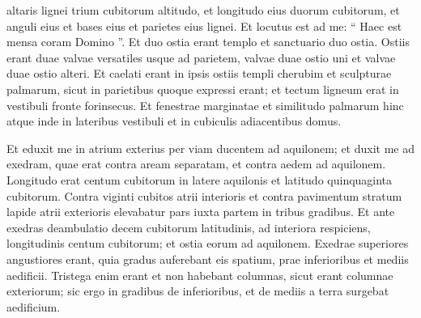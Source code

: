 \begin{biblechapter}
\begin{biblechapter}
\begin{biblechapter}
\begin{biblechapter}
\begin{biblechapter}
\begin{biblechapter}
\begin{biblechapter}
\begin{biblechapter}
\begin{biblechapter}
\begin{biblechapter}
\begin{biblechapter}
\begin{biblechapter}
\begin{biblechapter}
\begin{biblechapter}
\begin{biblechapter}
\begin{biblechapter}
\begin{biblechapter}
\begin{biblechapter}
\begin{biblechapter}
\begin{biblechapter}
\begin{biblechapter}
\begin{biblechapter}
\begin{biblechapter}
\begin{biblechapter}
\begin{biblechapter}
\begin{biblechapter}
\begin{biblechapter}
\begin{biblechapter}
\begin{biblechapter}
\begin{biblechapter}
\begin{biblechapter}
\begin{biblechapter}
\begin{biblechapter}
\begin{biblechapter}
\begin{biblechapter}
\begin{biblechapter}
\begin{biblechapter}
\begin{biblechapter}
\begin{biblechapter}
\begin{biblechapter}
\begin{biblechapter}
\verse altaris lignei trium cubitorum altitudo, et longitudo eius duorum cubitorum, et anguli eius et bases eius et parietes eius lignei. Et locutus est ad me: “ Haec est mensa coram Domino ”.
 \verse Et duo ostia erant templo et sanctuario 
\verse duo ostia. Ostiis erant duae valvae versatiles usque ad parietem, valvae duae ostio uni et valvae duae ostio alteri. 
\verse Et caelati erant in ipsis ostiis templi cherubim et sculpturae palmarum, sicut in parietibus quoque expressi erant; et tectum ligneum erat in vestibuli fronte forinsecus. 
\verse Et fenestrae marginatae et similitudo palmarum hinc atque inde in lateribus vestibuli et in cubiculis adiacentibus domus.
 
\begin{biblechapter}
\verse Et eduxit me in atrium exterius per viam ducentem ad aquilonem; et duxit me ad exedram, quae erat contra aream separatam, et contra aedem ad aquilonem. 
 \verse Longitudo erat centum cubitorum in latere aquilonis et latitudo quinquaginta cubitorum. 
\verse Contra viginti cubitos atrii interioris et contra pavimentum stratum lapide atrii exterioris elevabatur pars iuxta partem in tribus gradibus. 
 \verse Et ante exedras deambulatio decem cubitorum latitudinis, ad interiora respiciens, longitudinis centum cubitorum; et ostia eorum ad aquilonem. 
\verse Exedrae superiores angustiores erant, quia gradus auferebant eis spatium, prae inferioribus et mediis aedificii. 
\verse Tristega enim erant et non habebant columnas, sicut erant columnae exteriorum; sic ergo in gradibus de inferioribus, et de mediis a terra surgebat aedificium. 

\end{biblechapter}
\end{biblechapter}
\end{biblechapter}
\end{biblechapter}
\end{biblechapter}
\end{biblechapter}
\end{biblechapter}
\end{biblechapter}
\end{biblechapter}
\end{biblechapter}
\end{biblechapter}
\end{biblechapter}
\end{biblechapter}
\end{biblechapter}
\end{biblechapter}
\end{biblechapter}
\end{biblechapter}
\end{biblechapter}
\end{biblechapter}
\end{biblechapter}
\end{biblechapter}
\end{biblechapter}
\end{biblechapter}
\end{biblechapter}
\end{biblechapter}
\end{biblechapter}
\end{biblechapter}
\end{biblechapter}
\end{biblechapter}
\end{biblechapter}
\end{biblechapter}
\end{biblechapter}
\end{biblechapter}
\end{biblechapter}
\end{biblechapter}
\end{biblechapter}
\end{biblechapter}
\end{biblechapter}
\end{biblechapter}
\end{biblechapter}
\end{biblechapter}
\end{biblechapter}
